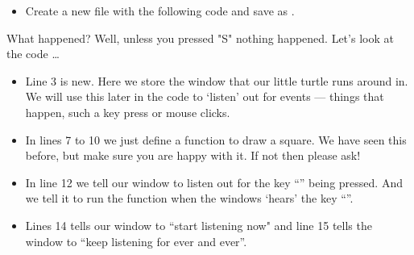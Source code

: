 \documentclass{coderdojo}
\begin{document}
\clearpage
\begin{itemize}
\item[\todoSymbol] \color{todo}
Create a new file with the following code and save as .
\end{itemize}


What happened? Well, unless you pressed "S" nothing happened. Let's look at the code \ldots

\begin{itemize}
\item[\pointSymbol]
Line 3 is new. Here we store the window that our little turtle runs around in. We will use this later in the code to `listen' out for events --- things that happen, such a key press or mouse clicks.
\item[\pointSymbol]
In lines 7 to 10 we just define a function to draw a square. We have seen this before, but make sure you are happy with it. If not then please ask!
\item[\pointSymbol]
In line 12 we tell our window to listen out for the key ``'' being pressed. And we tell it to run the function  when the windows `hears' the key ``''.
\item[\pointSymbol]
Lines 14 tells our window to ``start listening now" and line 15 tells the window to ``keep listening for ever and ever''.

\end{itemize}
\end{document}
